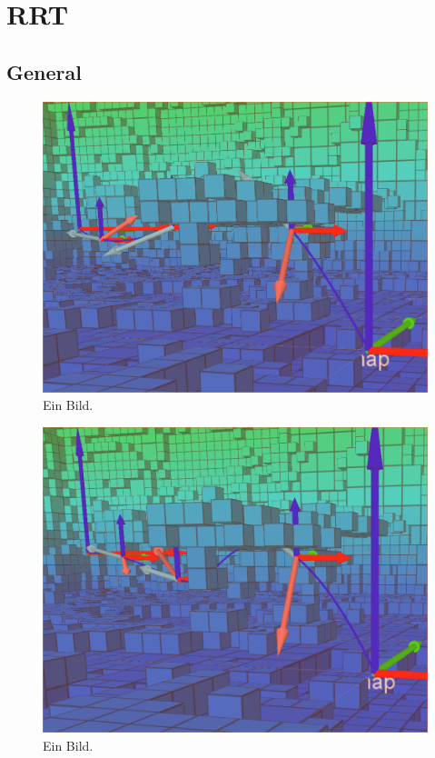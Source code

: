 \chapter{RRT}\label{sec:RRT}

\section{General}


\begin{figure}[h]
   \centering
   \includegraphics[width=1\textwidth]{pics/initialSolution.png}
   \caption{Ein Bild.}
\end{figure}


\begin{figure}[h]
   \centering
   \includegraphics[width=1\textwidth]{pics/Vertex_in_middle_2.png}
   \caption{Ein Bild.}
\end{figure}

